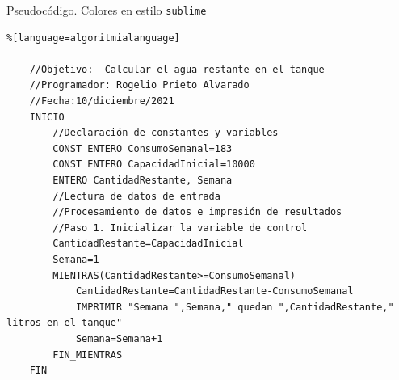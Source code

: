 \documentclass[spanish,11pt,twoside]{article}
\newcommand{\myawesomebox}[2]{ %
	\awesomebox[uasblue]{2pt}{#1}{uasblue}{#2}
}
\newcommand{\myawesomeboxshort}[3]{ %
	\awesomebox[uasblue]{2pt}{#1}{uasblue}{\textcolor{uasblue}{\textbf{\textsf{#2}}} #3}
}
\begin{document}



\vspace{120px}





Pseudocódigo. Colores en estilo \texttt{sublime} 
\begin{mdframed}[backgroundcolor=clr-background,topline=true,bottomline=true,leftline=false,rightline=false,innerleftmargin=\leftskip, innertopmargin=0pt]
\begin{lstlisting}%[language=algoritmialanguage]
	
	//Objetivo:  Calcular el agua restante en el tanque 
	//Programador: Rogelio Prieto Alvarado
	//Fecha:10/diciembre/2021
	INICIO
		//Declaración de constantes y variables
		CONST ENTERO ConsumoSemanal=183
		CONST ENTERO CapacidadInicial=10000
		ENTERO CantidadRestante, Semana
		//Lectura de datos de entrada
		//Procesamiento de datos e impresión de resultados
		//Paso 1. Inicializar la variable de control
		CantidadRestante=CapacidadInicial
		Semana=1
		MIENTRAS(CantidadRestante>=ConsumoSemanal)
			CantidadRestante=CantidadRestante-ConsumoSemanal
			IMPRIMIR "Semana ",Semana," quedan ",CantidadRestante," litros en el tanque"
			Semana=Semana+1
		FIN_MIENTRAS
	FIN	
\end{lstlisting}
\end{mdframed}
\end{document}
